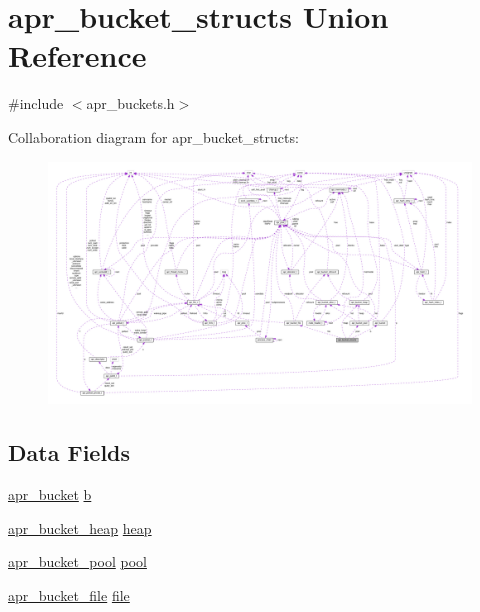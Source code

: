 \hypertarget{unionapr__bucket__structs}{}\section{apr\+\_\+bucket\+\_\+structs Union Reference}
\label{unionapr__bucket__structs}


{\ttfamily \#include $<$apr\+\_\+buckets.\+h$>$}



Collaboration diagram for apr\+\_\+bucket\+\_\+structs\+:
\nopagebreak
\begin{figure}[H]
\begin{center}
\leavevmode
\includegraphics[width=350pt]{unionapr__bucket__structs__coll__graph}
\end{center}
\end{figure}
\subsection*{Data Fields}
\begin{DoxyCompactItemize}
\item 
\hyperlink{structapr__bucket}{apr\+\_\+bucket} \hyperlink{unionapr__bucket__structs_a840c42a20727de2e4534ca05f1f6c990}{b}
\item 
\hyperlink{structapr__bucket__heap}{apr\+\_\+bucket\+\_\+heap} \hyperlink{unionapr__bucket__structs_a5335dc82d8250e511a9c55e5fea97141}{heap}
\item 
\hyperlink{structapr__bucket__pool}{apr\+\_\+bucket\+\_\+pool} \hyperlink{unionapr__bucket__structs_ab926fe2af7c1780c03bf1669766db4a1}{pool}
\item 
\hyperlink{structapr__bucket__file}{apr\+\_\+bucket\+\_\+file} \hyperlink{unionapr__bucket__structs_ab339255acdf750133759a0d67b3f2e30}{file}
\end{DoxyCompactItemize}


